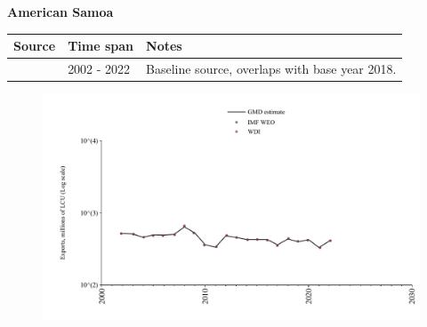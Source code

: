 \documentclass[12pt,a4paper,landscape]{article}
\begin{document}
\begin{adjustbox}{max totalsize={\paperwidth}{\paperheight},center}
\begin{minipage}[t][\textheight][t]{\textwidth}
\vspace*{0.5cm}
{}
\begin{center}
{\Large\bfseries American Samoa}
\end{center}
\vspace{0.5cm}
\begin{table}[H]
\centering
\small
\begin{tabular}{|l|l|l|}
\hline
\textbf{Source} & \textbf{Time span} & \textbf{Notes} \\
\hline
\rowcolor{white}\cite{WDI}& 2002 - 2022 &Baseline source, overlaps with base year 2018.\\
\hline
\end{tabular}
\end{table}
\begin{figure}[H]
\centering
\includegraphics[width=\textwidth,height=0.6\textheight,keepaspectratio]{graphs/ASM_exports.pdf}
\end{figure}
\end{minipage}
\end{adjustbox}
\end{document}
